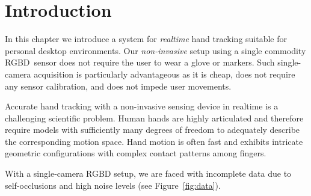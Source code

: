 

\section{Introduction} \label{sec:htrack-intro}

%
%


In this chapter we introduce a system for \emph{realtime} hand tracking suitable for personal desktop environments. Our \emph{non-invasive} setup using a single commodity RGBD~sensor does not require the user to wear a glove or markers. 
Such single-camera acquisition is particularly advantageous as it is cheap, does not require any sensor calibration, and does not impede user movements. 

Accurate hand tracking with a non-invasive sensing device in realtime is a challenging scientific problem. Human hands are highly articulated and therefore require models with sufficiently many degrees of freedom to adequately describe the corresponding motion space. Hand motion is often fast and exhibits intricate geometric configurations with complex contact patterns among fingers. 

With a single-camera RGBD setup, we are faced with incomplete data due to self-occlusions and high noise levels (see Figure~\ref{fig:data}).

